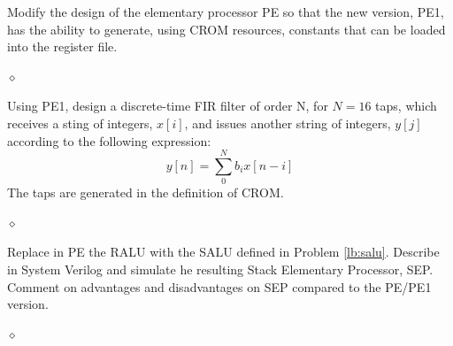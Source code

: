 \begin{problem}
Modify the design of the elementary processor PE so that the new version, PE1, has the ability to generate, using CROM resources, constants that can be loaded into the register file.

$\diamond$
\end{problem}

\begin{problem}
Using PE1, design a  discrete-time FIR filter of order N, for $N=16$ taps, which receives a sting of integers, $x[i]$, and issues another string of integers, $y[j]$ according to the following expression:
$$y[n] = \sum_0^N b_ix[n-i]$$
The taps are generated in the definition of CROM.

$\diamond$
\end{problem}

\begin{problem}
Replace in PE the RALU with the SALU defined in Problem \ref{lb:salu}. Describe in System Verilog and simulate he resulting Stack Elementary Processor, SEP. Comment on advantages and disadvantages on SEP compared to the PE/PE1 version.

$\diamond$
\end{problem}
